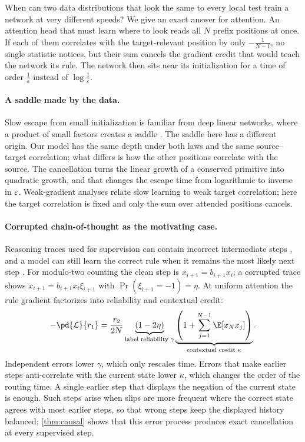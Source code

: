 When can two data distributions that look the same to every local test train a network at very different speeds?
We give an exact answer for attention. An attention head that must learn where to look reads all $N$ prefix positions at once.
If each of them correlates with the target-relevant position by only $-\tfrac{1}{N-1}$, no single statistic notices, but their sum cancels the
gradient credit that would teach the network its rule. The network then sits near its initialization for a time of order $\tfrac{1}{\varepsilon}$
instead of $\log\tfrac{1}{\varepsilon}$.

\paragraph{A saddle made by the data.}
Slow escape from small initialization is familiar from deep linear networks, where a product of small factors creates a saddle
\citep{saxe2014exact,shamir2019exponential}. The saddle here has a different origin. Our model has the same depth under both laws and the same
source--target correlation; what differs is how the other positions correlate with the source. The cancellation turns the linear growth of a
conserved primitive into quadratic growth, and that changes the escape time from logarithmic to inverse in $\varepsilon$.
Weak-gradient analyses \citep{shalevshwartz2017failures,abbe2025parities} relate slow learning to weak target correlation; here the target correlation is fixed
and only the sum over attended positions cancels.

\paragraph{Corrupted chain-of-thought as the motivating case.}
Reasoning traces used for supervision can contain incorrect intermediate steps \citep{havrilla2024noise,zhou2024noisyrationales},
and a model can still learn the correct rule when it remains the most likely next step \citep{natarajan2013noisy,patrini2017loss}.
For modulo-two counting the clean step is $x_{i+1}=b_{i+1}x_i$; a corrupted trace shows $x_{i+1}=b_{i+1}x_i\xi_{i+1}$ with $\Pr(\xi_{i+1}=-1)=\eta$.
At uniform attention the rule gradient factorizes into reliability and contextual credit:
\[
 -\pd{\mathcal L}{r_1}
 =\frac{r_2}{2N}
 \underbrace{(1-2\eta)}_{\text{label reliability }\gamma}
 \underbrace{\left(1+\sum_{j=1}^{N-1}\E[x_Nx_j]\right)}_{\text{contextual credit }\kappa}.
\]
Independent errors lower $\gamma$, which only rescales time. Errors that make earlier steps anti-correlate with the current state lower $\kappa$,
which changes the order of the routing time. A single earlier step that displays the negation of the current state is enough.
Such steps arise when slips are more frequent where the correct state agrees with most earlier steps, so that wrong steps keep the displayed
history balanced; \cref{thm:causal} shows that this error process produces exact cancellation at every supervised step.

